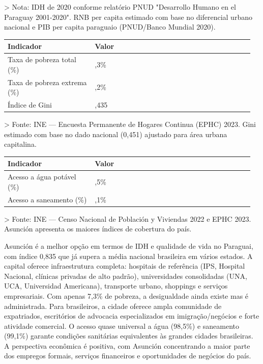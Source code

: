 > Nota: IDH de 2020 conforme relatório PNUD "Desarrollo Humano en el Paraguay 2001-2020". RNB per capita estimado com base no diferencial urbano nacional e PIB per capita paraguaio (PNUD/Banco Mundial 2020).


{\small
\setlength{\tabcolsep}{3pt}
\renewcommand{\arraystretch}{1.12}
\begin{tabularx}{\linewidth}{>{\raggedright\arraybackslash}p{0.34\linewidth} >{\raggedright\arraybackslash}p{0.62\linewidth}}
\toprule
Indicador & Valor \\
\midrule
Taxa de pobreza total (\%) & 7,3\% \\
Taxa de pobreza extrema (\%) & 1,2\% \\
Índice de Gini & 0,435 \\
\bottomrule
\end{tabularx}
}

> Fonte: INE --- Encuesta Permanente de Hogares Continua (EPHC) 2023. Gini estimado com base no dado nacional (0,451) ajustado para área urbana capitalina.


{\small
\setlength{\tabcolsep}{3pt}
\renewcommand{\arraystretch}{1.12}
\begin{tabularx}{\linewidth}{>{\raggedright\arraybackslash}p{0.34\linewidth} >{\raggedright\arraybackslash}p{0.62\linewidth}}
\toprule
Indicador & Valor \\
\midrule
Acesso a água potável (\%) & 98,5\% \\
Acesso a saneamento (\%) & 99,1\% \\
\bottomrule
\end{tabularx}
}

> Fonte: INE --- Censo Nacional de Población y Viviendas 2022 e EPHC 2023. Asunción apresenta os maiores índices de cobertura do país.


Asunción é a melhor opção em termos de IDH e qualidade de vida no Paraguai, com índice 0,835 que já supera a média nacional brasileira em vários estados. A capital oferece infraestrutura completa: hospitais de referência (IPS, Hospital Nacional, clínicas privadas de alto padrão), universidades consolidadas (UNA, UCA, Universidad Americana), transporte urbano, shoppings e serviços empresariais. Com apenas 7,3\% de pobreza, a desigualdade ainda existe mas é administrada. Para brasileiros, a cidade oferece ampla comunidade de expatriados, escritórios de advocacia especializados em imigração/negócios e forte atividade comercial. O acesso quase universal a água (98,5\%) e saneamento (99,1\%) garante condições sanitárias equivalentes às grandes cidades brasileiras. A perspectiva econômica é positiva, com Asunción concentrando a maior parte dos empregos formais, serviços financeiros e oportunidades de negócios do país.


